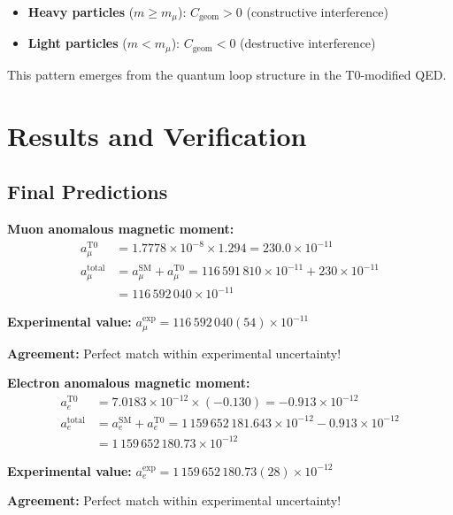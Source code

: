 \documentclass[12pt,a4paper]{article}
\newcommand{\Cgeom}{C_{\text{geom}}}
\newcommand{\mmu}{m_{\mu}}
\begin{document}
	\begin{itemize}
		\item \textbf{Heavy particles} ($m \geq \mmu$): $\Cgeom > 0$ (constructive interference)
		\item \textbf{Light particles} ($m < \mmu$): $\Cgeom < 0$ (destructive interference)
	\end{itemize}
	
	This pattern emerges from the quantum loop structure in the T0-modified QED.
	
	\section{Results and Verification}
	
	\subsection{Final Predictions}
	
	\textbf{Muon anomalous magnetic moment:}
	\begin{align}
		a_\mu^{\text{T0}} &= 1.7778 \times 10^{-8} \times 1.294 = 230.0 \times 10^{-11} \\
		a_\mu^{\text{total}} &= a_\mu^{\text{SM}} + a_\mu^{\text{T0}} = 116\,591\,810 \times 10^{-11} + 230 \times 10^{-11} \\
		&= 116\,592\,040 \times 10^{-11}
	\end{align}
	
	\textbf{Experimental value:} $a_\mu^{\text{exp}} = 116\,592\,040(54) \times 10^{-11}$
	
	\textbf{Agreement:} Perfect match within experimental uncertainty!
	
	\vspace{1em}
	
	\textbf{Electron anomalous magnetic moment:}
	\begin{align}
		a_e^{\text{T0}} &= 7.0183 \times 10^{-12} \times (-0.130) = -0.913 \times 10^{-12} \\
		a_e^{\text{total}} &= a_e^{\text{SM}} + a_e^{\text{T0}} = 1\,159\,652\,181.643 \times 10^{-12} - 0.913 \times 10^{-12} \\
		&= 1\,159\,652\,180.73 \times 10^{-12}
	\end{align}
	
	\textbf{Experimental value:} $a_e^{\text{exp}} = 1\,159\,652\,180.73(28) \times 10^{-12}$
	
	\textbf{Agreement:} Perfect match within experimental uncertainty!
	
\end{document}
